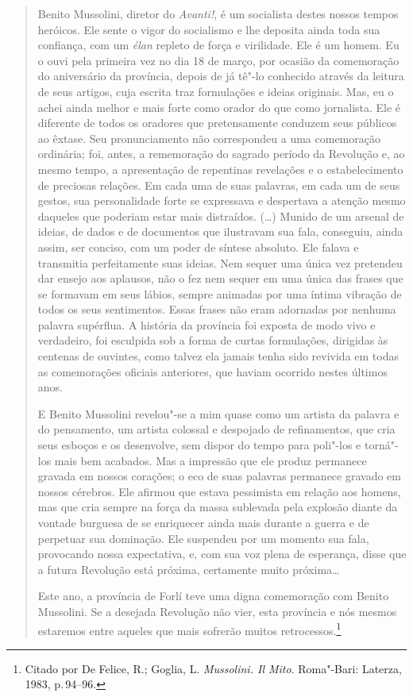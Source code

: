 \begin{quote}
Benito Mussolini, diretor do \emph{Avanti!}, é um socialista destes
nossos tempos heróicos. Ele sente o vigor do socialismo e lhe deposita
ainda toda sua confiança, com um \emph{élan} repleto de força e
virilidade. Ele é um homem. Eu o ouvi pela primeira vez no dia 18 de
março, por ocasião da comemoração do aniversário da província, depois de
já tê"-lo conhecido através da leitura de seus artigos, cuja escrita traz
formulações e ideias originais. Mas, eu o achei ainda melhor e mais
forte como orador do que como jornalista. Ele é diferente de todos os
oradores que pretensamente conduzem seus públicos ao êxtase. Seu
pronunciamento não correspondeu a uma comemoração ordinária; foi, antes,
a rememoração do sagrado período da Revolução e, ao mesmo tempo, a
apresentação de repentinas revelações e o estabelecimento de preciosas
relações. Em cada uma de suas palavras, em cada um de seus gestos, sua
personalidade forte se expressava e despertava a atenção mesmo daqueles
que poderiam estar mais distraídos. (\ldots{}) Munido de um arsenal de
ideias, de dados e de documentos que ilustravam sua fala, conseguiu,
ainda assim, ser conciso, com um poder de síntese absoluto. Ele falava e
transmitia perfeitamente suas ideias. Nem sequer uma única vez pretendeu
dar ensejo aos aplausos, não o fez nem sequer em uma única das frases
que se formavam em seus lábios, sempre animadas por uma íntima vibração
de todos os seus sentimentos. Essas frases não eram adornadas por
nenhuma palavra supérflua. A história da província foi exposta de modo
vivo e verdadeiro, foi esculpida sob a forma de curtas formulações,
dirigidas às centenas de ouvintes, como talvez ela jamais tenha sido
revivida em todas as comemorações oficiais anteriores, que haviam
ocorrido nestes últimos anos.

E Benito Mussolini revelou"-se a mim quase como um artista da palavra e
do pensamento, um artista colossal e despojado de refinamentos, que cria
seus esboços e os desenvolve, sem dispor do tempo para poli"-los e
torná"-los mais bem acabados. Mas a impressão que ele produz permanece
gravada em nossos corações; o eco de suas palavras permanece gravado em
nossos cérebros. Ele afirmou que estava pessimista em relação aos
homens, mas que cria sempre na força da massa sublevada pela explosão
diante da vontade burguesa de se enriquecer ainda mais durante a guerra
e de perpetuar sua dominação. Ele suspendeu por um momento sua fala,
provocando nossa expectativa, e, com sua voz plena de esperança, disse
que a futura Revolução está próxima, certamente muito próxima\ldots{}

Este ano, a província de Forlí teve uma digna comemoração com Benito
Mussolini. Se a desejada Revolução não vier, esta província e nós mesmos
estaremos entre aqueles que mais sofrerão muitos retrocessos.\footnote{Citado
  por De Felice, R.; Goglia, L. \emph{Mussolini. Il Mito}. Roma"-Bari:
  Laterza, 1983, p.\,94--96.}
\end{quote}

